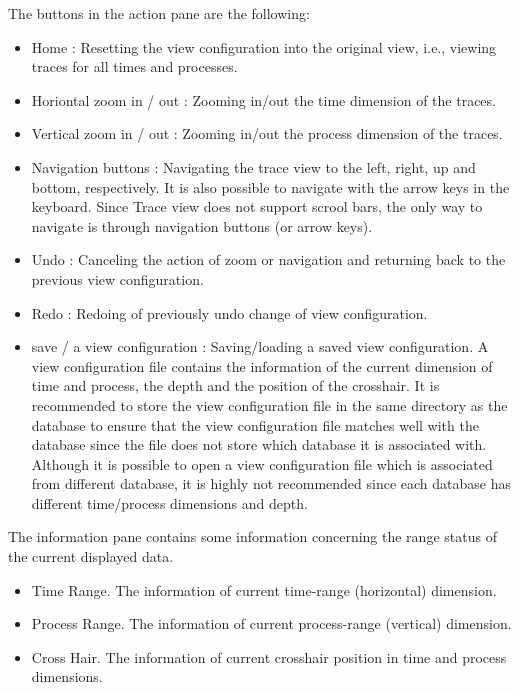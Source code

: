 \documentclass[english]{article}
\begin{document}
The buttons in the action pane are the following:
\begin{itemize}

\item Home : Resetting the view configuration into the original view, i.e., viewing traces for all times and processes.
\item Horiontal zoom in / out : Zooming in/out the time dimension of the traces. 
\item Vertical zoom in / out : Zooming in/out the process dimension of the traces.
\item Navigation buttons : Navigating the trace view to the left, right, up and bottom, respectively. It is also possible to navigate with the arrow keys in the keyboard. Since Trace view does not support scrool bars, the only way to navigate is through navigation buttons (or arrow keys).
\item Undo : Canceling the action of zoom or navigation and returning back to the previous view configuration.
\item Redo : Redoing of previously undo change of view configuration.
\item save  / a view configuration : Saving/loading a saved view configuration. 
A view configuration file contains the information of the current dimension of time and process, the depth and the position of the crosshair. 
It is recommended to store the view configuration file in the same directory as the database to ensure that the view configuration file matches well with the database since the file does not store which database it is associated with. 
Although it is possible to open a view configuration file which is associated from different database, it is highly not recommended since each database has different time/process dimensions and depth.


\end{itemize}

The information pane contains some information concerning the range status of the current displayed data.
\begin{itemize}
 \item Time Range. The information of current time-range (horizontal) dimension. 
 \item Process Range. The information of current process-range (vertical) dimension. 
 \item Cross Hair. The information of current crosshair position in time and process dimensions. 
\end{itemize}
\end{document}
